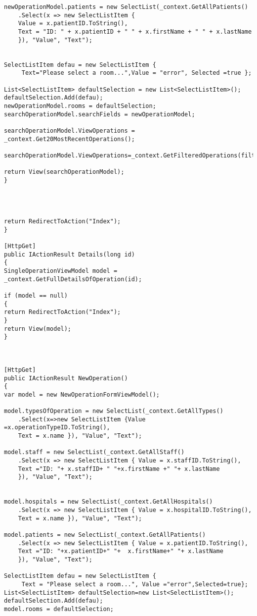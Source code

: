 \begin{lstlisting}
newOperationModel.patients = new SelectList(_context.GetAllPatients()
	.Select(x => new SelectListItem {
	Value = x.patientID.ToString(), 
	Text = "ID: " + x.patientID + " " + x.firstName + " " + x.lastName 
	}), "Value", "Text");


SelectListItem defau = new SelectListItem {
	 Text="Please select a room...",Value = "error", Selected =true };

List<SelectListItem> defaultSelection = new List<SelectListItem>();
defaultSelection.Add(defau);
newOperationModel.rooms = defaultSelection;
searchOperationModel.searchFields = newOperationModel;

searchOperationModel.ViewOperations = _context.Get20MostRecentOperations();

searchOperationModel.ViewOperations=_context.GetFilteredOperations(filters);

return View(searchOperationModel);
}




return RedirectToAction("Index");
}

[HttpGet]
public IActionResult Details(long id)
{
SingleOperationViewModel model = _context.GetFullDetailsOfOperation(id);

if (model == null)
{
return RedirectToAction("Index");
}
return View(model);
}



[HttpGet]
public IActionResult NewOperation()
{
var model = new NewOperationFormViewModel();

model.typesOfOperation = new SelectList(_context.GetAllTypes()
	.Select(x=>new SelectListItem {Value =x.operationTypeID.ToString(),
	Text = x.name }), "Value", "Text");

model.staff = new SelectList(_context.GetAllStaff()
	.Select(x => new SelectListItem { Value = x.staffID.ToString(), 
	Text ="ID: "+ x.staffID+ " "+x.firstName +" "+ x.lastName
	}), "Value", "Text");


model.hospitals = new SelectList(_context.GetAllHospitals()
	.Select(x => new SelectListItem { Value = x.hospitalID.ToString(), 
	Text = x.name }), "Value", "Text");

model.patients = new SelectList(_context.GetAllPatients()
	.Select(x => new SelectListItem { Value = x.patientID.ToString(), 
	Text ="ID: "+x.patientID+" "+  x.firstName+" "+ x.lastName 
	}), "Value", "Text");

SelectListItem defau = new SelectListItem {
	 Text = "Please select a room...", Value ="error",Selected=true};
List<SelectListItem> defaultSelection=new List<SelectListItem>();
defaultSelection.Add(defau);
model.rooms = defaultSelection;



\end{lstlisting}
